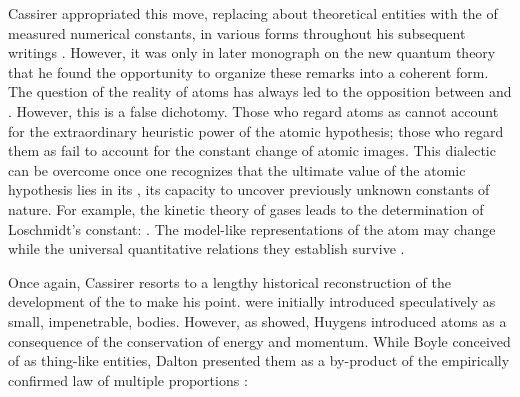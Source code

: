 \documentclass[submitted,12pt]{article}
\renewcommand{\DI}[2]{\citep[#1/#2]{Cassirer1936}}
\renewcommand{\PSF}[2]{\citep[#1/#2]{Cassirer1929}}
\renewcommand{\tm}{\footnote{Translation modified}}
\begin{document}
Cassirer appropriated this  move, replacing  about theoretical entities with the  of measured numerical constants, in various forms throughout his subsequent writings \PSF{520}{446}. However, it was only in  later monograph on the new quantum theory that he found the opportunity to organize these remarks into a coherent form. The question of the reality of atoms has always led to the opposition between  and . However, this is a false dichotomy. Those who regard atoms as  cannot account for the extraordinary heuristic power of the atomic hypothesis; those who regard them as  fail to account for the constant change of atomic images. This dialectic can be overcome once one recognizes that the ultimate value of the atomic hypothesis lies in its , its capacity to uncover previously unknown constants of nature. For example, the kinetic theory of gases leads to the determination of Loschmidt's constant:  \DI{178}{143\tm}. The model-like representations of the atom may change while the universal quantitative relations they establish survive \DI{179}{144}. 

Once again, Cassirer resorts to a lengthy historical reconstruction of the development of the  to make his point.  were initially introduced speculatively as small, impenetrable,  bodies. However, as \citet{Lasswitz1890} showed, Huygens introduced atoms as a consequence of the conservation of energy and momentum. While Boyle conceived of  as thing-like entities, Dalton presented them as a by-product of the empirically confirmed law of multiple proportions \DI{183}{147}:
\end{document}

